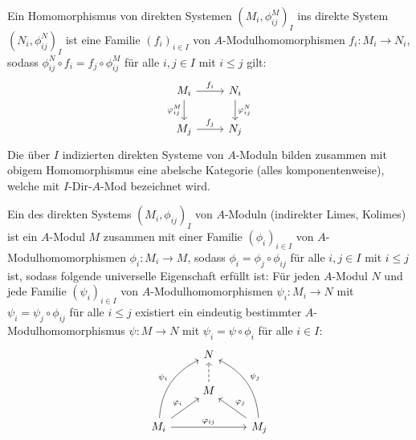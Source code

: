 \begin{bem+df}\label{16.4}
	Ein Homomorphismus von direkten Systemen $(M_i, \phi_{ij}^M)_I$ ins direkte System $(N_i, \phi_{ij}^N)_I$ ist eine Familie $(f_i)_{i\in I}$ von $A$-Modulhomomorphismen $f_i:M_i \to N_i$, sodass $\phi_{ij}^N \circ f_i = f_j \circ \phi_{ij}^M$ für alle $i,j\in I$ mit $i\leq j$ gilt:
	$$\begin{tikzcd}
	M_i \arrow{r}{f_i} \arrow[swap]{d}{\phi_{ij}^M} & N_i \arrow{d}{\phi_{ij}^N}\\
	M_j \arrow{r}{f_j} & N_j
	\end{tikzcd}$$
	Die über $I$ indizierten direkten Systeme von $A$-Moduln bilden zusammen mit obigem Homomorphismus eine abelsche Kategorie (alles komponentenweise), welche mit $I$-Dir-$A$-Mod bezeichnet wird.
\end{bem+df}
\begin{df}\label{16.5}
	Ein  des direkten Systems $(M_i, \phi_{ij})_I$ von $A$-Moduln (indirekter Limes, Kolimes) ist ein $A$-Modul $M$ zusammen mit einer Familie $(\phi_i)_{i\in I}$ von $A$-Modulhomomorphismen $\phi_i:M_i \to M$, sodass $\phi_i = \phi_j \circ \phi_{ij}$ für alle $i,j\in I$ mit $i\leq j$ ist, sodass folgende universelle Eigenschaft erfüllt ist: Für jeden $A$-Modul $N$ und jede Familie $(\psi_i)_{i\in I}$ von $A$-Modulhomomorphismen $\psi_i :M_i \to N$ mit $\psi_i = \psi_j \circ \phi_{ij}$ für alle $i\leq j$ existiert ein eindeutig bestimmter $A$-Modulhomomorphismus $\psi:M \to N$ mit $\psi_i = \psi \circ \phi_i$ für alle $i\in I$:
	$$\begin{tikzcd}
	& N & \\
	& M \arrow[dashed]{u}& \\
	M_i \arrow{ur}{\phi_i} \arrow[bend left]{uur}{\psi_i} \arrow{rr}{\phi_{ij}} & & M_j \arrow[swap]{ul}{\phi_j} \arrow[bend right, swap]{uul}{\psi_j}
	\end{tikzcd}$$
\end{df}
